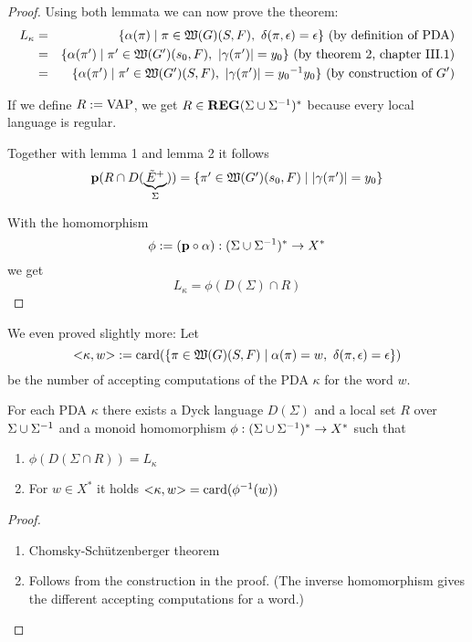 \begin{proof}
\medskip
Using both lemmata we can now prove the theorem:
\begin{eqnarray*}
L_\kappa &=& \setof{\alpha(\pi) \mid \pi \in \pathcat{G}(S, F),\ \delta(\pi,
\epsilon) = \epsilon}\text{ (by definition of PDA)} \\
&=& \setof{\alpha(\pi') \mid \pi' \in \pathcat{G'}(s_0, F),\ |\gamma(\pi')| =
y_0}\text{ (by theorem 2, chapter III.1)} \\
&=& \setof{\alpha(\pi') \mid \pi' \in \pathcat{G'}(S, F),\
|\gamma(\pi')| = \inv{y_0} y_0}\text{ (by construction of $G'$)}
\end{eqnarray*}

If we define $R := \mathrm{VAP}$, we get $R \in \mbox{{\bf REG}}(\Sigma \cup {\Sigma}^{-1})^*$
because every local language is regular.

Together with lemma 1 and lemma 2 it follows
\[ \mathbf{p}({R \cap D(\underbrace{\tilde{E}^+}_{\Sigma})}) = \mbox{$\{\pi' \in
\mbox{$\mathfrak{W}({G'})$}(s_0, F) \mid |\gamma(\pi')| = y_0\}$} \]

With the homomorphism
\[ \phi := (\mathbf{p} \circ \alpha) : (\Sigma \cup {\Sigma}^{-1})^* \to X^* \]
we get
\[ L_\kappa = \phi(D(\Sigma) \cap R) \]
\end{proof}

We even proved slightly more: Let 
\[ {<}\kappa, w{>} := \mathrm{card}({\mbox{$\{\pi \in
\mbox{$\mathfrak{W}({G})$}(S,F) \mid \alpha(\pi) = w,\ \delta(\pi, \epsilon) = \epsilon\}$}})
\]
be the number of accepting computations of the PDA $\kappa$ for the word $w$.

\begin{corollary}
For each PDA $\kappa$ there exists a Dyck language $D(\Sigma)$ and a local set
$R$ over $\Sigma \cup {\Sigma}^{-1}$ and a monoid homomorphism $\phi:
(\Sigma \cup {\Sigma}^{-1})^* \to X^*$ such that
\begin{enumerate}
  \item $\phi(D(\Sigma\cap R)) = L_\kappa$
  \item For $w\in X^*$ it holds ${<}\kappa, w{>} = \mathrm{card}({\phi^{-1}(w)})$
\end{enumerate}
\end{corollary}

\begin{proof}\ 

\begin{enumerate}
  \item Chomsky-Schützenberger theorem
  \item Follows from the construction in the proof. (The inverse homomorphism
  gives the different accepting computations for a word.)
\end{enumerate}
\end{proof}


